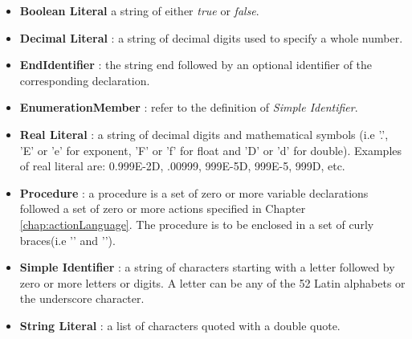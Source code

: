 \begin{itemize}
\item \textbf{Boolean Literal} a string of either \textit{true} or \textit{false}.

\item \textbf{Decimal Literal} : a string of decimal digits used to specify a whole number.

\item \textbf{EndIdentifier} : the string end followed by an optional identifier of the corresponding declaration.

\item \textbf{EnumerationMember} : refer to the definition of \textit{Simple Identifier}.

\item \textbf{Real Literal} : a string of decimal digits and mathematical symbols (i.e '.', 'E' or 'e' for exponent, 'F' or 'f' for float and 'D' or 'd' for double). Examples of real literal are: 0.999E-2D, .00999, 999E-5D, 999E-5, 999D, etc.

\item \textbf{Procedure} : a procedure is a set of zero or more variable declarations followed a set of zero or more actions specified in Chapter \ref{chap:actionLanguage}. The procedure is to be enclosed in a set of curly braces(i.e '{' and '}').

\item \textbf{Simple Identifier} : a string of characters starting with a letter followed by zero or more letters or digits. A letter can be any of the 52 Latin alphabets or the underscore character.

\item \textbf{String Literal} : a list of characters quoted with a double quote.
\end{itemize}

